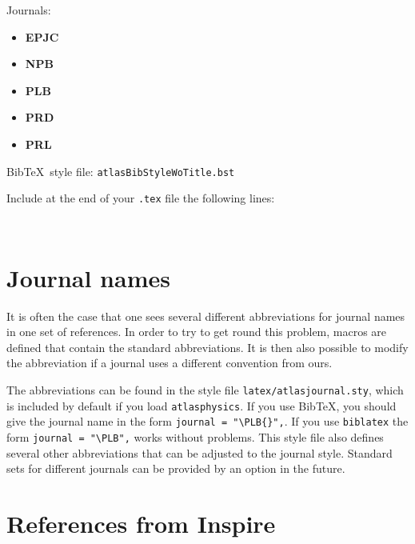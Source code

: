 \documentclass[UKenglish]{latex/atlasdoc}
\newcommand*{\BibTeX}{Bib\TeX}
\newcommand{\File}[1]{\texttt{#1}\xspace}
\newcommand{\Package}[1]{\texttt{#1}\xspace}
\begin{document}
Journals:
\begin{itemize}\setlength{\parskip}{0pt}\setlength{\itemsep}{0pt}
\item \textbf{EPJC}
\item \textbf{NPB}
\item \textbf{PLB}
\item \textbf{PRD}
\item \textbf{PRL}
\end{itemize}
%
\BibTeX\ style file: \Package{atlasBibStyleWoTitle.bst}

\noindent Include at the end of your \File{.tex} file the following lines:
\begin{verbatim}


\end{verbatim}


\section{Journal names}

It is often the case that one sees several different abbreviations for journal
names in one set of references.
In order to try to get round this problem, macros are defined that
contain the standard abbreviations.
It is then also possible to modify the abbreviation if a journal uses a different convention from ours.

The abbreviations can be found in the style file \File{latex/atlasjournal.sty},
which is included by default if you load \Package{atlasphysics}.
If you use \BibTeX, you should give the journal name in the form
\verb|journal = "\PLB{}",|. 
If you use \Package{biblatex} the form \verb|journal = "\PLB",| works without problems.
This style file also defines several other abbreviations that can be adjusted to the
journal style. 
Standard sets for different journals can be provided by an option in the future.


\section{References from Inspire}
\label{sc:inquire}
\end{document}
